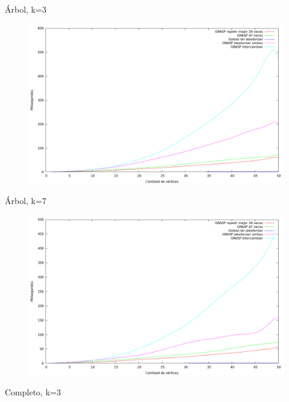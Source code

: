 Árbol, k=3

\begin{figure}[H]
  \begin{center}
    \includegraphics[scale=0.35]{imagenes/ej6-arbol-k3-tiempo.png}
  \end{center}
\end{figure}

Árbol, k=7

\begin{figure}[H]
  \begin{center}
    \includegraphics[scale=0.35]{imagenes/ej6-arbol-k7-tiempo.png}
  \end{center}
\end{figure}

Completo, k=3

